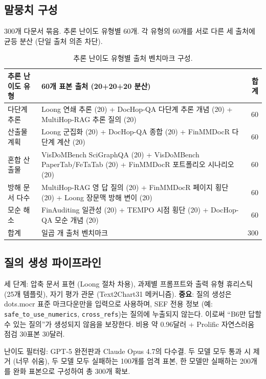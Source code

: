 \documentclass[11pt]{article}
\begin{document}
\subsection{말뭉치 구성}

300개 다문서 묶음. 추론 난이도 유형별 60개. 각 유형의 60개를 서로 다른 세 출처에 균등 분산 (단일 출처 의존 차단).

\begin{table}[h]
\centering
\small
\begin{tabular}{lp{8cm}r}
\toprule
추론 난이도 유형 & 60개 표본 출처 (20+20+20 분산) & 합계 \\
\midrule
다단계 추론 & Loong 연쇄 추론 (20) + DocHop-QA 다단계 추론 개념 (20) + MultiHop-RAG 추론 질의 (20) & 60 \\
산출물 계획 & Loong 군집화 (20) + DocHop-QA 종합 (20) + FinMMDocR 다단계 계산 (20) & 60 \\
혼합 산출물 & VisDoMBench SciGraphQA (20) + VisDoMBench PaperTab/FeTaTab (20) + FinMMDocR 포트폴리오 시나리오 (20) & 60 \\
방해 문서 다수 & MultiHop-RAG 영 답 질의 (20) + FinMMDocR 페이지 횡단 (20) + Loong 장문맥 방해 변이 (20) & 60 \\
모순 해소 & FinAuditing 일관성 (20) + TEMPO 시점 횡단 (20) + DocHop-QA 모순 개념 (20) & 60 \\
\midrule
합계 & 일곱 개 출처 벤치마크 & 300 \\
\bottomrule
\end{tabular}
\caption{추론 난이도 유형별 출처 벤치마크 구성.}
\label{tab:corpus}
\end{table}

\subsection{질의 생성 파이프라인}
\label{sec:querygen}

세 단계: 압축 문서 표현 (Loong 절차 차용), 과제별 프롬프트와 출력 유형 휴리스틱 (25개 템플릿), 자기 평가 관문 (Text2Chart31 메커니즘). \textbf{중요}: 질의 생성은 dots.mocr 표준 마크다운만을 입력으로 사용하며, SEF 전용 정보 (예: \texttt{safe\_to\_use\_numerics}, \texttt{cross\_refs})는 질의에 누출되지 않는다. 이로써 ``B6만 답할 수 있는 질의''가 생성되지 않음을 보장한다. 비용 약 0.96달러 + Prolific 자연스러움 점검 30표본 30달러.

난이도 필터링: GPT-5 완전판과 Claude Opus 4.7의 다수결. 두 모델 모두 통과 시 제거 (너무 쉬움), 두 모델 모두 실패하는 100개를 엄격 표본, 한 모델만 실패하는 200개를 완화 표본으로 구성하여 총 300개 확보.
\end{document}
